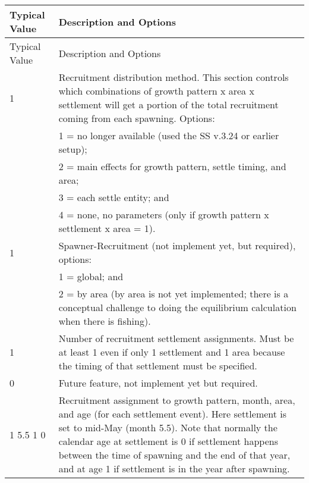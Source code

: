 	
\begin{longtable}{p{0.5cm} p{2cm} p{12cm}}
	\hline
	\multicolumn{2}{l}{Typical Value} & Description and Options\Tstrut\Bstrut\\
	\hline
	\endfirsthead

	\hline
	\multicolumn{2}{l}{Typical Value} & Description and Options\Tstrut\Bstrut\\
	\hline
	\endhead

	\hline
	\endfoot

	\endlastfoot
	
	1 \Tstrut & & Recruitment distribution method. This section controls which combinations of growth pattern x area x settlement will get a portion of the total recruitment coming from each spawning.  Options: \\
	  & & 1 = no longer available (used the SS v.3.24 or earlier setup); \\
	  & & 2 = main effects for growth pattern, settle timing, and area; \\
	  & & 3 = each settle entity; and \\
	  & & 4 = none, no parameters (only if growth pattern x settlement x area = 1). \Bstrut\\

	\hline
	1 & & Spawner-Recruitment (not implement yet, but required), options: \Tstrut\\
	  & & 1 = global; and \\
	  & & 2 = by area (by area is not yet implemented; there is a conceptual challenge to doing the equilibrium calculation when there is fishing).\Bstrut\\

	\hline
	1 \Tstrut & & Number of recruitment settlement assignments.  Must be at least 1 even if only 1 settlement and 1 area because the timing of that settlement must be specified.\Bstrut\\

	\hline
	0 \Tstrut & & Future feature, not implement yet but required. \Bstrut\\

	\hline
	\multicolumn{2}{l}{1 5.5 1 0} \Tstrut & Recruitment assignment to growth pattern, month, area, and age (for each settlement event).  Here settlement is set to mid-May (month 5.5). Note that normally the calendar age at settlement is 0 if settlement happens between the time of spawning and the end of that year, and at age 1 if settlement is in the year after spawning.  %
	\Bstrut\\
	\hline
\end{longtable}


